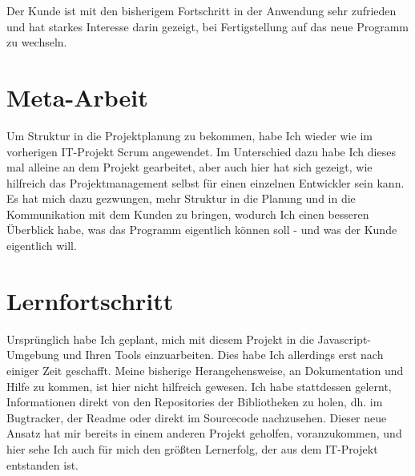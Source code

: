\documentclass[a4paper,10pt]{scrartcl}
\begin{document}
  Der Kunde ist mit den bisherigem Fortschritt in der Anwendung sehr zufrieden
  und hat starkes Interesse darin gezeigt, bei Fertigstellung auf das neue
  Programm zu wechseln.

\section{Meta-Arbeit}

  Um Struktur in die Projektplanung zu bekommen, habe Ich wieder wie im
  vorherigen IT-Projekt Scrum angewendet.
  Im Unterschied dazu habe Ich dieses mal alleine an dem Projekt gearbeitet,
  aber auch hier hat sich gezeigt, wie hilfreich das Projektmanagement selbst
  für einen einzelnen Entwickler sein kann.
  Es hat mich dazu gezwungen, mehr Struktur in die Planung und in die
  Kommunikation mit dem Kunden zu bringen, wodurch Ich einen besseren Überblick
  habe, was das Programm eigentlich können soll - und was der Kunde eigentlich
  will.

\section{Lernfortschritt}

  Ursprünglich habe Ich geplant, mich mit diesem Projekt in die
  Javascript-Umgebung und Ihren Tools einzuarbeiten.
  Dies habe Ich allerdings erst nach einiger Zeit geschafft.
  Meine bisherige Herangehensweise, an Dokumentation und Hilfe zu kommen,
  ist hier nicht hilfreich gewesen.
  Ich habe stattdessen gelernt, Informationen direkt von den Repositories der
  Bibliotheken zu holen, dh. im Bugtracker, der Readme oder direkt im
  Sourcecode nachzusehen.
  Dieser neue Ansatz hat mir bereits in einem anderen Projekt geholfen,
  voranzukommen, und hier sehe Ich auch für mich den größten Lernerfolg, der
  aus dem IT-Projekt entstanden ist.
\end{document}
